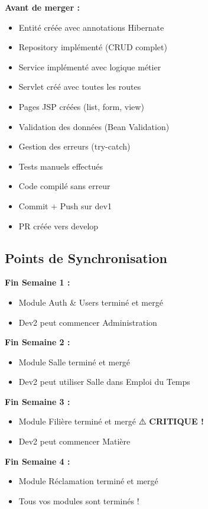 \documentclass[11pt,a4paper]{article}
\begin{document}
\textbf{Avant de merger :}
\begin{itemize}
    \item[$\square$] Entité créée avec annotations Hibernate
    \item[$\square$] Repository implémenté (CRUD complet)
    \item[$\square$] Service implémenté avec logique métier
    \item[$\square$] Servlet créé avec toutes les routes
    \item[$\square$] Pages JSP créées (list, form, view)
    \item[$\square$] Validation des données (Bean Validation)
    \item[$\square$] Gestion des erreurs (try-catch)
    \item[$\square$] Tests manuels effectués
    \item[$\square$] Code compilé sans erreur
    \item[$\square$] Commit + Push sur dev1
    \item[$\square$] PR créée vers develop
\end{itemize}

\subsection{Points de Synchronisation}

\textbf{Fin Semaine 1 :}
\begin{itemize}
    \item[$\square$] Module Auth \& Users terminé et mergé
    \item[$\square$] Dev2 peut commencer Administration
\end{itemize}

\textbf{Fin Semaine 2 :}
\begin{itemize}
    \item[$\square$] Module Salle terminé et mergé
    \item[$\square$] Dev2 peut utiliser Salle dans Emploi du Temps
\end{itemize}

\textbf{Fin Semaine 3 :}
\begin{itemize}
    \item[$\square$] Module Filière terminé et mergé ⚠️ \textbf{CRITIQUE !}
    \item[$\square$] Dev2 peut commencer Matière
\end{itemize}

\textbf{Fin Semaine 4 :}
\begin{itemize}
    \item[$\square$] Module Réclamation terminé et mergé
    \item[$\square$] Tous vos modules sont terminés !
\end{itemize}
\end{document}
